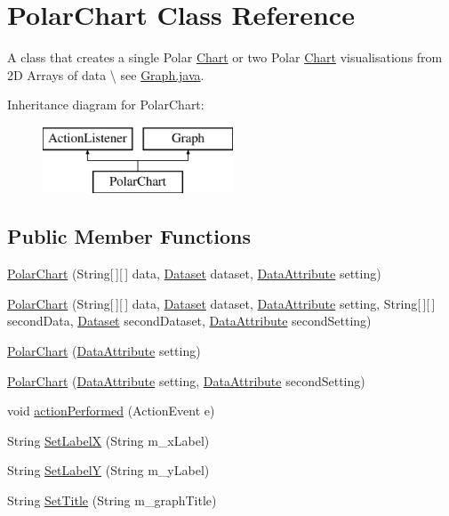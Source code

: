 \hypertarget{class_polar_chart}{\section{Polar\-Chart Class Reference}
\label{class_polar_chart}
}


A class that creates a single Polar \hyperlink{interface_chart}{Chart} or two Polar \hyperlink{interface_chart}{Chart} visualisations from 2\-D Arrays of data \textbackslash{} see \hyperlink{_graph_8java}{Graph.\-java}.  


Inheritance diagram for Polar\-Chart\-:\begin{figure}[H]
\begin{center}
\leavevmode
\includegraphics[height=2.000000cm]{class_polar_chart}
\end{center}
\end{figure}
\subsection*{Public Member Functions}
\begin{DoxyCompactItemize}
\item 
\hyperlink{class_polar_chart_a5f108692551cb8c74b55fae0138cc2fb}{Polar\-Chart} (String\mbox{[}$\,$\mbox{]}\mbox{[}$\,$\mbox{]} data, \hyperlink{class_dataset}{Dataset} dataset, \hyperlink{class_data_attribute}{Data\-Attribute} setting)
\item 
\hyperlink{class_polar_chart_a66861893d4eabbb0f8ab27988ce04e86}{Polar\-Chart} (String\mbox{[}$\,$\mbox{]}\mbox{[}$\,$\mbox{]} data, \hyperlink{class_dataset}{Dataset} dataset, \hyperlink{class_data_attribute}{Data\-Attribute} setting, String\mbox{[}$\,$\mbox{]}\mbox{[}$\,$\mbox{]} second\-Data, \hyperlink{class_dataset}{Dataset} second\-Dataset, \hyperlink{class_data_attribute}{Data\-Attribute} second\-Setting)
\item 
\hyperlink{class_polar_chart_a96a2e0f5e310b4982c03d01f65804d7e}{Polar\-Chart} (\hyperlink{class_data_attribute}{Data\-Attribute} setting)
\item 
\hyperlink{class_polar_chart_aba50c5e55fd2d54e6fbdc684724d7d31}{Polar\-Chart} (\hyperlink{class_data_attribute}{Data\-Attribute} setting, \hyperlink{class_data_attribute}{Data\-Attribute} second\-Setting)
\item 
void \hyperlink{class_polar_chart_a9aadea04bcb9d3419f025dbecc8b18f1}{action\-Performed} (Action\-Event e)
\item 
String \hyperlink{class_polar_chart_a2509add6b1beaf9d1c07603dff1b5602}{Set\-Label\-X} (String m\-\_\-x\-Label)
\item 
String \hyperlink{class_polar_chart_a625a4bf978d88a6b2accfd1a7b00fcb0}{Set\-Label\-Y} (String m\-\_\-y\-Label)
\item 
String \hyperlink{class_polar_chart_a1db3b5708bc341845d92584c28c59d34}{Set\-Title} (String m\-\_\-graph\-Title)
\end{DoxyCompactItemize}
